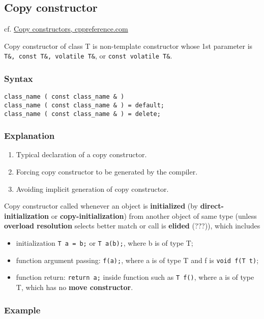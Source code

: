 \documentclass[10pt]{amsart}
\begin{document}
\begin{multicols*}{2}
\subsection{Copy constructor}

cf. \href{http://en.cppreference.com/w/cpp/language/copy_constructor}{Copy constructors, cppreference.com}

Copy constructor of class T is non-template constructor whose 1st parameter is \verb|T&, const T&, volatile T&|, or \verb|const volatile T&|.  

\subsubsection{Syntax}  

\begin{lstlisting}
class_name ( const class_name & )  
class_name ( const class_name & ) = default;  
class_name ( const class_name & ) = delete;
\end{lstlisting}  

\subsubsection{Explanation}  
\begin{enumerate}
	\item Typical declaration of a copy constructor.  
	\item Forcing copy constructor to be generated by the compiler.  
	\item Avoiding implicit generation of copy constructor.  
\end{enumerate}


Copy constructor called whenever an object is \textbf{initialized} (by \textbf{direct-initialization} or \textbf{copy-initialization}) from another object of same type (unless \textbf{overload resolution} selects better match or call is \textbf{elided} (???)), which includes  
\begin{itemize}
	\item initialization \verb|T a = b;| or \verb|T a(b);|, where b is of type T;  
	\item function argument passing: \verb|f(a);|, where a is of type T and f is \verb|void f(T t)|;  
	\item function return: \verb|return a;| inside function such as \verb|T f()|, where a is of type T, which has no \textbf{move constructor}.   
\end{itemize}

\subsubsection{Example}  
	

\end{multicols*}
\end{document}
